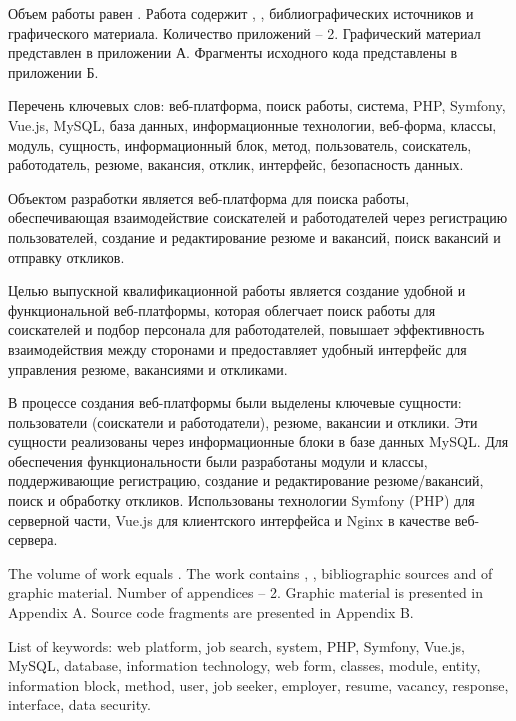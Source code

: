 
Объем работы равен . Работа содержит , ,  библиографических источников и  графического материала. Количество приложений – 2. Графический материал представлен в приложении А. Фрагменты исходного кода представлены в приложении Б.

Перечень ключевых слов: веб-платформа, поиск работы, система, PHP, Symfony, Vue.js, MySQL, база данных, информационные технологии, веб-форма, классы, модуль, сущность, информационный блок, метод, пользователь, соискатель, работодатель, резюме, вакансия, отклик, интерфейс, безопасность данных.

Объектом разработки является веб-платформа для поиска работы, обеспечивающая взаимодействие соискателей и работодателей через регистрацию пользователей, создание и редактирование резюме и вакансий, поиск вакансий и отправку откликов.

Целью выпускной квалификационной работы является создание удобной и функциональной веб-платформы, которая облегчает поиск работы для соискателей и подбор персонала для работодателей, повышает эффективность взаимодействия между сторонами и предоставляет удобный интерфейс для управления резюме, вакансиями и откликами.

В процессе создания веб-платформы были выделены ключевые сущности: пользователи (соискатели и работодатели), резюме, вакансии и отклики. Эти сущности реализованы через информационные блоки в базе данных MySQL. Для обеспечения функциональности были разработаны модули и классы, поддерживающие регистрацию, создание и редактирование резюме/вакансий, поиск и обработку откликов. Использованы технологии Symfony (PHP) для серверной части, Vue.js для клиентского интерфейса и Nginx в качестве веб-сервера.

  
The volume of work equals . The work contains , ,  bibliographic sources and  of graphic material. Number of appendices – 2. Graphic material is presented in Appendix A. Source code fragments are presented in Appendix B.

List of keywords: web platform, job search, system, PHP, Symfony, Vue.js, MySQL, database, information technology, web form, classes, module, entity, information block, method, user, job seeker, employer, resume, vacancy, response, interface, data security.

